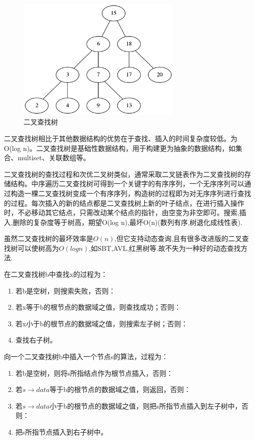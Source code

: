 \documentclass[a4paper]{article}
\begin{document}
\begin{CJK}{UTF8}{gbsn}
\begin{figure}[htbp]
\centering\includegraphics[height=6cm]{bt2.png}
\caption{二叉查找树}
\end{figure}

二叉查找树相比于其他数据结构的优势在于查找、插入的时间复杂度较低。为O(log n)。二叉查找树是基础性数据结构，用于构建更为抽象的数据结构，如集合、multiset、关联数组等。

二叉查找树的查找过程和次优二叉树类似，通常采取二叉链表作为二叉查找树的存储结构。中序遍历二叉查找树可得到一个关键字的有序序列，一个无序序列可以通过构造一棵二叉查找树变成一个有序序列，构造树的过程即为对无序序列进行查找的过程。每次插入的新的结点都是二叉查找树上新的叶子结点，在进行插入操作时，不必移动其它结点，只需改动某个结点的指针，由空变为非空即可。搜索,插入,删除的复杂度等于树高，期望O(log n),最坏O(n)(数列有序,树退化成线性表).

虽然二叉查找树的最坏效率是$O(n)$,但它支持动态查询,且有很多改进版的二叉查找树可以使树高为$O(logn)$,如SBT,AVL,红黑树等.故不失为一种好的动态查找方法.

在二叉查找树b中查找x的过程为：
\begin{enumerate}
\item 若b是空树，则搜索失败，否则：
\item 若x等于b的根节点的数据域之值，则查找成功；否则：
\item 若x小于b的根节点的数据域之值，则搜索左子树；否则：
\item 查找右子树。
\end{enumerate}


向一个二叉查找树b中插入一个节点s的算法，过程为：
\begin{enumerate}
\item 若b是空树，则将s所指结点作为根节点插入，否则：
\item 若$s\rightarrow data$等于b的根节点的数据域之值，则返回，否则：
\item 若$s\rightarrow data$小于b的根节点的数据域之值，则把s所指节点插入到左子树中，否则：
\item 把s所指节点插入到右子树中。
\end{enumerate}


\end{CJK}
\end{document}
